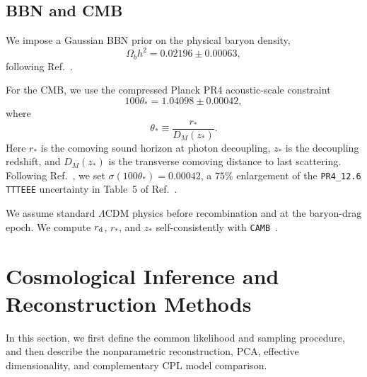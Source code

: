 \documentclass[
  aps,
  prd,
  twocolumn,
  nofootinbib,
  superscriptaddress,
  floatfix,
  longbibliography
]{revtex4-2}
\newcommand{\LCDM}{\ensuremath{\Lambda\mathrm{CDM}}}
\begin{document}























\subsection{BBN and CMB}

We impose a Gaussian BBN prior on the physical baryon density,
\begin{equation}
 \Omega_b h^2 = 0.02196 \pm 0.00063,
\end{equation}
following Ref.~\cite{Schoneberg2026}.

For the CMB, we use the compressed Planck PR4 acoustic-scale constraint
\begin{equation}
 100\theta_* = 1.04098 \pm 0.00042,
 \label{eq:theta_star_constraint}
\end{equation}
where
\begin{equation}
 \theta_* \equiv \frac{r_*}{D_M(z_*)}.
\end{equation}
Here $r_*$ is the comoving sound horizon at photon decoupling,
$z_*$ is the decoupling redshift, and $D_M(z_*)$ is the transverse
comoving distance to last scattering. Following Ref.~\cite{Gu_2025}, we
set $\sigma(100\theta_*)=0.00042$, a $75\%$ enlargement of the
\texttt{PR4\_12.6 TTTEEE} uncertainty in Table~5 of
Ref.~\cite{Rosenberg_2022}.

We assume standard $\LCDM$ physics before recombination and at the
baryon-drag epoch. We compute $r_{\rm d}$, $r_*$, and $z_*$
self-consistently with \texttt{CAMB}~\cite{Lewis_2000}.





\section{Cosmological Inference and Reconstruction Methods}
\label{sec:cosmological_inference}

In this section, we first define the common likelihood and sampling procedure, and then
describe the nonparametric reconstruction, PCA, effective dimensionality,
and complementary CPL model comparison.
\end{document}
